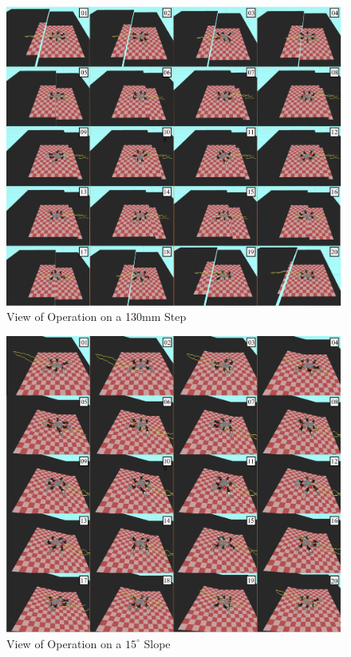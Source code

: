 \begin{figure}[htbp]
  \begin{center}
    \includegraphics[width=1.0\linewidth]{figure/chapter4/integration/130mm_view.png}
    \caption{View of Operation on a 130mm Step}
    \label{fig:ch4_result_integration_view_130mm}  %
  \end{center}
\end{figure}

\begin{figure}[htbp]
  \begin{center}
    \includegraphics[width=1.0\linewidth]{figure/chapter4/integration/15deg_view.png}
    \caption{View of Operation on a $15^{\circ}$ Slope}
    \label{fig:ch4_result_integration_view_15deg}  %
  \end{center}
\end{figure}

